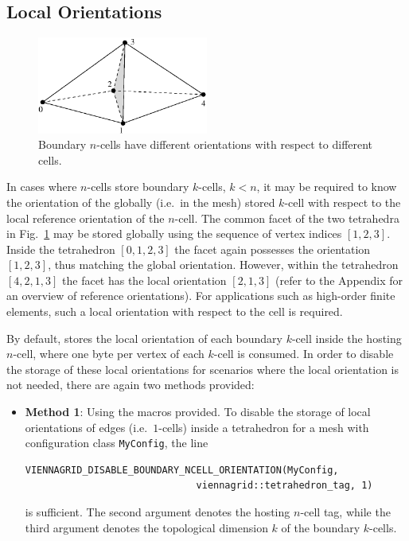\begin{itemize}
\subsection{Local Orientations} \label{subsec:customize-local-orientations}
\begin{figure}[tb]
\centering
 \includegraphics[width=0.5\textwidth]{figures/interface-tets.eps}
 \caption{Boundary $n$-cells have different orientations with respect to different cells.}
 \label{fig:orientation-boundary-ncells}
\end{figure}

In cases where $n$-cells store boundary $k$-cells, $k<n$, it may be required to know the orientation of the globally (i.e.~in the mesh) stored $k$-cell with respect to the local reference orientation of the $n$-cell. The common facet of the two tetrahedra in Fig.~\ref{fig:orientation-boundary-ncells} may be stored globally using the sequence of vertex indices $[1, 2, 3]$. Inside the tetrahedron $[0, 1, 2, 3]$ the facet again possesses the orientation $[1, 2, 3]$, thus matching the global orientation. However, within the tetrahedron $[4, 2, 1, 3]$ the facet has the local orientation $[2, 1, 3]$ (refer to the Appendix for an overview of reference orientations). For applications such as high-order finite elements, such a local orientation with respect to the cell is required.


By default, {\ViennaGrid} stores the local orientation of each boundary $k$-cell inside the hosting $n$-cell, where one byte per vertex of each $k$-cell is consumed. In order to disable the storage of these local orientations for scenarios where the local orientation is not needed, there are again two methods provided:
\begin{itemize}
 \item \textbf{Method 1}: Using the macros provided. To disable the storage of local orientations of edges (i.e.~$1$-cells) inside a tetrahedron for a mesh with configuration class \lstinline|MyConfig|, the line
\begin{lstlisting}
VIENNAGRID_DISABLE_BOUNDARY_NCELL_ORIENTATION(MyConfig,
                              viennagrid::tetrahedron_tag, 1) 
\end{lstlisting}
is sufficient. The second argument denotes the hosting $n$-cell tag, while the third argument denotes the topological dimension $k$ of the boundary $k$-cells.


\end{itemize}
\end{itemize}
